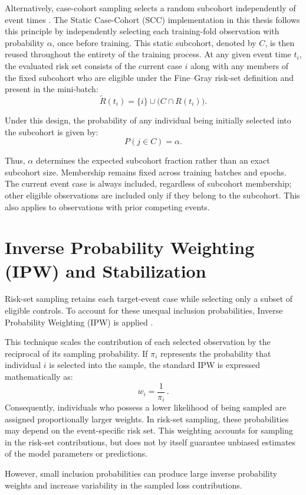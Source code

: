 \documentclass[a4paper,twoside,12pt]{report}
\begin{document}
Alternatively, case-cohort sampling selects a random subcohort independently of event times \citep{Prentice1986}. The Static Case-Cohort (SCC) implementation in this thesis follows this principle by independently selecting each training-fold observation with probability $\alpha$, once before training. This static subcohort, denoted by $C$, is then reused throughout the entirety of the training process. At any given event time $t_i$, the evaluated risk set consists of the current case $i$ along with any members of the fixed subcohort who are eligible under the Fine--Gray risk-set definition and present in the mini-batch:
\[
\tilde{R}(t_i)=\{i\}\cup\bigl(C\cap R(t_i)\bigr).
\]

Under this design, the probability of any individual being initially selected into the subcohort is given by:
\[
P(j\in C)=\alpha.
\]

Thus, $\alpha$ determines the expected subcohort fraction rather than an exact subcohort size. Membership remains fixed across training batches and epochs. The current event case is always included, regardless of subcohort membership; other eligible observations are included only if they belong to the subcohort. This also applies to observations with prior competing events.

\section{Inverse Probability Weighting (IPW) and Stabilization}

Risk-set sampling retains each target-event case while selecting only a subset of eligible controls. To account for these unequal inclusion probabilities, Inverse Probability Weighting (IPW) is applied \citep{HorvitzThompson1952}.

This technique scales the contribution of each selected observation by the reciprocal of its sampling probability. If $\pi_i$ represents the probability that individual $i$ is selected into the sample, the standard IPW is expressed mathematically as:
$$w_i = \frac{1}{\pi_i} \,.$$
Consequently, individuals who possess a lower likelihood of being sampled are assigned proportionally larger weights. In risk-set sampling, these probabilities may depend on the event-specific risk set. This weighting accounts for sampling in the risk-set contributions, but does not by itself guarantee unbiased estimates of the model parameters or predictions.

However, small inclusion probabilities can produce large inverse probability weights and increase variability in the sampled loss contributions.
\end{document}
